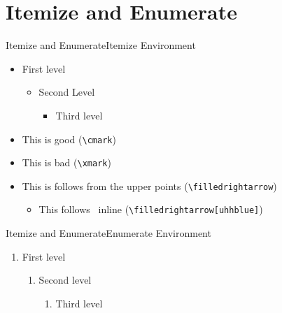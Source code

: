 \section{Itemize and Enumerate}


\begin{frame}[c, fragile]{Itemize and Enumerate}{Itemize Environment}
    \begin{itemize}
        \item First level
            \begin{itemize}
                \item Second Level
                    \begin{itemize}
                        \item Third level
                    \end{itemize}
            \end{itemize}
        \item[\cmark] This is good (\verb|\cmark|)
        \item[\xmark] This is bad (\verb|\xmark|)
        \item[\filledrightarrow] This is follows from the upper points (\verb|\filledrightarrow|)
            \begin{itemize}
                \item This follows \filledrightarrow[uhhblue]~inline (\verb|\filledrightarrow[uhhblue]|)
            \end{itemize}
    \end{itemize} 
\end{frame}

\begin{frame}[c]{Itemize and Enumerate}{Enumerate Environment}
    \begin{enumerate}
        \item First level
            \begin{enumerate}
                \item Second level
                    \begin{enumerate}
                        \item Third level
                    \end{enumerate}
            \end{enumerate}
    \end{enumerate}
\end{frame}
